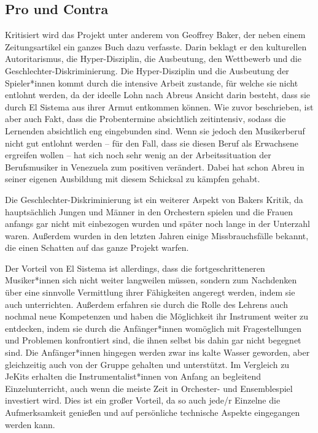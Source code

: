 \subsection{Pro und Contra}
Kritisiert wird das Projekt unter anderem von Geoffrey Baker, der neben einem
Zeitungsartikel ein ganzes Buch dazu verfasste. Darin beklagt er den kulturellen
Autoritarismus, die Hyper-Disziplin, die Ausbeutung, den Wettbewerb und die
Geschlechter-Diskriminierung. Die Hyper-Disziplin und die Ausbeutung der
Spieler*innen kommt durch die intensive Arbeit zustande, für welche sie nicht
entlohnt werden, da der ideelle Lohn nach Abreus Ansicht darin besteht, dass sie
durch El Sistema aus ihrer Armut entkommen können. Wie zuvor beschrieben, ist
aber auch Fakt, dass die Probentermine absichtlich zeitintensiv, sodass die
Lernenden absichtlich eng eingebunden sind. Wenn sie jedoch den Musikerberuf
nicht gut entlohnt werden – für den Fall, dass sie diesen Beruf als Erwachsene
ergreifen wollen – hat sich noch sehr wenig an der Arbeitssituation der
Berufsmusiker in Venezuela zum positiven verändert. Dabei hat schon Abreu in
seiner eigenen Ausbildung mit diesem Schicksal zu kämpfen gehabt.

Die Geschlechter-Diskriminierung ist ein weiterer Aspekt von Bakers Kritik, da
hauptsächlich Jungen und Männer in den Orchestern spielen und die Frauen anfangs
gar nicht mit einbezogen wurden und später noch lange in der Unterzahl waren.
Außerdem wurden in den letzten Jahren einige Missbrauchsfälle bekannt, die einen
Schatten auf das ganze Projekt warfen. 

Der Vorteil von El Sistema ist allerdings, dass die fortgeschritteneren
Musiker*innen sich nicht weiter langweilen müssen, sondern zum Nachdenken über
eine sinnvolle Vermittlung ihrer Fähigkeiten angeregt werden, indem sie auch
unterrichten. Außerdem erfahren sie durch die Rolle des Lehrens auch nochmal
neue Kompetenzen und haben die Möglichkeit ihr Instrument weiter zu entdecken,
indem sie durch die Anfänger*innen womöglich mit Fragestellungen und Problemen
konfrontiert sind, die ihnen selbst bis dahin gar nicht begegnet sind. Die
Anfänger*innen hingegen werden zwar ins kalte Wasser geworden, aber gleichzeitig
auch von der Gruppe gehalten und unterstützt.
\autocite[160]{roebke_mantilla:vom_wilden_lernen}
Im Vergleich zu JeKits erhalten die Instrumentalist*innen von Anfang an
begleitend Einzelunterricht, auch wenn die meiste Zeit in Orchester- und
Ensemblespiel investiert wird. Dies ist ein großer Vorteil, da so auch jede/r
Einzelne die Aufmerksamkeit genießen und auf persönliche technische Aspekte
eingegangen werden kann. 
